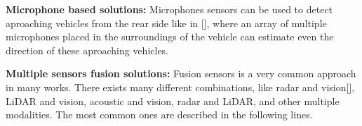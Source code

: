 \textbf{Microphone based solutions:}
Microphones sensors can be used to detect aproaching vehicles from the rear side like in [], where an array of multiple microphones placed in the surroundings of the vehicle can estimate even the direction of these aproaching vehicles.


\textbf{Multiple sensors fusion solutions:}
Fusion sensors is a very common approach in many works. There exists many different combinations, like radar and vision[], LiDAR and vision, acoustic and vision, radar and LiDAR, and other multiple modalities. The most common ones are described in the following lines.
